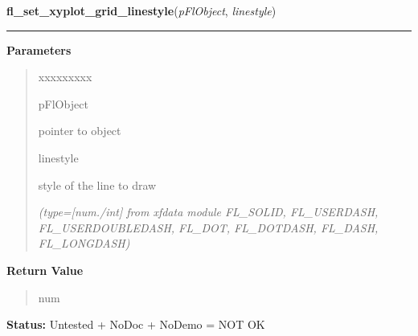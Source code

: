     \label{xformslib:flxyplot:fl_set_xyplot_grid_linestyle}

    \vspace{0.5ex}

\hspace{.8\funcindent}\begin{boxedminipage}{\funcwidth}

    \raggedright \textbf{fl\_set\_xyplot\_grid\_linestyle}(\textit{pFlObject}, \textit{linestyle})

    \vspace{-1.5ex}

    \rule{\textwidth}{0.5\fboxrule}
\setlength{\parskip}{2ex}
\setlength{\parskip}{1ex}
      \textbf{Parameters}
      \vspace{-1ex}

      \begin{quote}
        \begin{Ventry}{xxxxxxxxx}

          \item[pFlObject]

          pointer to object

          \item[linestyle]

          style of the line to draw

            {\it (type=[num./int] from xfdata module FL\_SOLID, FL\_USERDASH, FL\_USERDOUBLEDASH, 
FL\_DOT, FL\_DOTDASH, FL\_DASH, FL\_LONGDASH)}

        \end{Ventry}

      \end{quote}

      \textbf{Return Value}
    \vspace{-1ex}

      \begin{quote}
      num

      \end{quote}

\textbf{Status:} Untested + NoDoc + NoDemo = NOT OK



    \end{boxedminipage}

    \label{xformslib:flxyplot:fl_set_xyplot_alphaxtics}

